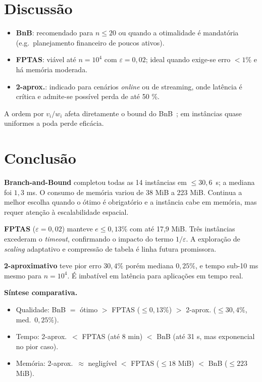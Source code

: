 \documentclass[10pt,a4paper]{article}
\begin{document}
\section{Discussão}\label{sec:disc}
\begin{itemize}
  \item \textbf{BnB}: recomendado para $n\!\le\!20$ ou quando
        a otimalidade é mandatória (e.g.\ planejamento financeiro
        de poucos ativos).
  \item \textbf{FPTAS}: viável até $n=10^{4}$ com
        $\varepsilon=0{,}02$; ideal quando exige-se erro
        $<1\%$ e há memória moderada.
  \item \textbf{2-aprox.}: indicado para cenários \textit{online} ou de
        streaming, onde latência é crítica e admite-se possível perda
        de até 50 \%.
\end{itemize}

A ordem por $v_i/w_i$ afeta diretamente o bound do
BnB~\cite{aula12}; em instâncias quase uniformes a poda perde
eficácia.

\section{Conclusão}\label{sec:conc}
\vspace{.5em}\noindent
\textbf{Branch-and-Bound} completou todas as 14 instâncias em
\mbox{$\le\!30,6$ s}; a mediana foi
$1,3$ ms.  O consumo de memória variou de 38 MiB
a 223 MiB.  Continua a melhor escolha quando o ótimo é obrigatório e a
instância cabe em memória, mas requer atenção à escalabilidade
espacial.

\vspace{.5em}\noindent
\textbf{FPTAS} ($\varepsilon=0{,}02$) manteve
$e\le0{,}13\%$ com até 17,9 MiB.  Três instâncias excederam o
\textit{timeout}, confirmando o impacto do termo $1/\varepsilon$.  A
exploração de \textit{scaling} adaptativo e compressão de tabela é
linha futura promissora.

\vspace{.5em}\noindent
\textbf{2-aproximativo} teve pior erro
$30,4\%$ porém mediana $0,25\%$, e tempo
sub-10 ms mesmo para $n=10^{4}$.  É imbatível em latência para
aplicações em tempo real.

\vspace{.5em}\noindent
\textbf{Síntese comparativa.}
\begin{itemize}
  \item Qualidade: BnB $=$ ótimo $>$ FPTAS
        ($\le0{,}13\%$) $>$ 2-aprox.
        ($\le30,4\%$, med.\ $0,25\%$).
  \item Tempo: 2-aprox.\ $<$ FPTAS (até 8 min) $<$ BnB
        (até 31 s, mas exponencial no pior caso).
  \item Memória: 2-aprox.\ $\approx$ negligível $<$ FPTAS
        ($\le18$ MiB) $<$ BnB ($\le223$ MiB).
\end{itemize}
\end{document}
